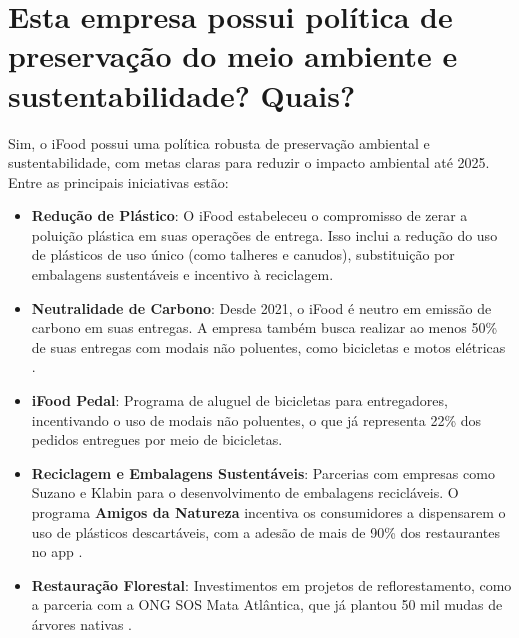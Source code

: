 \section{Esta empresa possui política de preservação do meio ambiente e sustentabilidade? Quais?}

Sim, o iFood possui uma política robusta de preservação ambiental e sustentabilidade, com metas claras para reduzir o impacto ambiental até 2025. Entre as principais iniciativas estão:

\begin{itemize}
    \item \textbf{Redução de Plástico}: O iFood estabeleceu o compromisso de zerar a poluição plástica em suas operações de entrega. Isso inclui a redução do uso de plásticos de uso único (como talheres e canudos), substituição por embalagens sustentáveis e incentivo à reciclagem.
    
    \item \textbf{Neutralidade de Carbono}: Desde 2021, o iFood é neutro em emissão de carbono em suas entregas. A empresa também busca realizar ao menos 50\% de suas entregas com modais não poluentes, como bicicletas e motos elétricas \cite{ifoodmeioambiente2023}.
    
    \item \textbf{iFood Pedal}: Programa de aluguel de bicicletas para entregadores, incentivando o uso de modais não poluentes, o que já representa 22\% dos pedidos entregues por meio de bicicletas.
    
    \item \textbf{Reciclagem e Embalagens Sustentáveis}: Parcerias com empresas como Suzano e Klabin para o desenvolvimento de embalagens recicláveis. O programa \textbf{Amigos da Natureza} incentiva os consumidores a dispensarem o uso de plásticos descartáveis, com a adesão de mais de 90\% dos restaurantes no app \cite{ifoodrelatorio2023}.
    
    \item \textbf{Restauração Florestal}: Investimentos em projetos de reflorestamento, como a parceria com a ONG SOS Mata Atlântica, que já plantou 50 mil mudas de árvores nativas \cite{ifoodnews2023}.
\end{itemize}